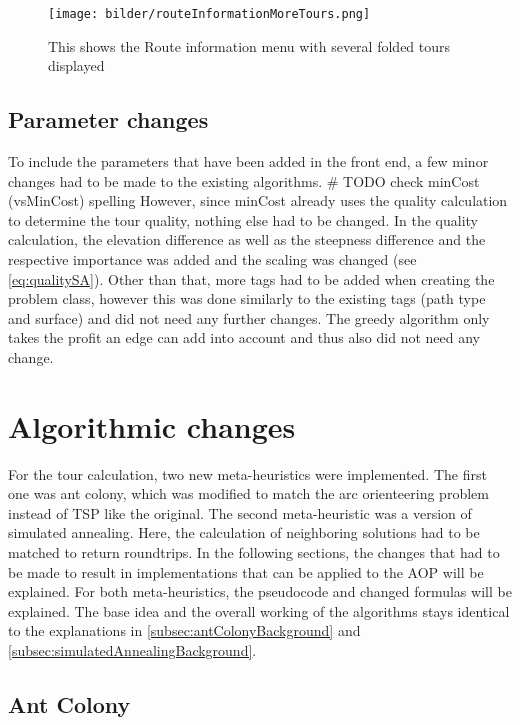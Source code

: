 \begin{figure}[H]
	\centering
	\texttt{[image: bilder/routeInformationMoreTours.png]}
	\caption{This shows the Route information menu with several folded tours displayed}
	\label{fig:actualFrontendToureInfoMenuMoreTours}
\end{figure}




\subsection{Parameter changes}
\label{subsec:parameterChanges}

To include the parameters that have been added in the front end, a few minor changes had to be made to the existing algorithms. \# TODO check minCost (vsMinCost) spelling
However, since minCost already uses the quality calculation to determine the tour quality, nothing else had to be changed.
In the quality calculation, the elevation difference as well as the steepness difference and the respective importance was added and the scaling was changed (see \ref{eq:qualitySA}).
Other than that, more tags had to be added when creating the problem class, however this was done similarly to the existing tags (path type and surface) and did not need any further changes.
The greedy algorithm only takes the profit an edge can add into account and thus also did not need any change.


\section{Algorithmic changes}
\label{sec:algorithmicChanges}

For the tour calculation, two new meta-heuristics were implemented.
The first one was ant colony, which was modified to match the arc orienteering problem instead of TSP like the original.
The second meta-heuristic was a version of simulated annealing.
Here, the calculation of neighboring solutions had to be matched to return roundtrips.
In the following sections, the changes that had to be made to result in implementations that can be applied to the AOP will be explained.
For both meta-heuristics, the pseudocode and changed formulas will be explained.
The base idea and the overall working of the algorithms stays identical to the explanations in \ref{subsec:antColonyBackground} and \ref{subsec:simulatedAnnealingBackground}.


\subsection{Ant Colony}
\label{subsec:antColonyImplementation}

